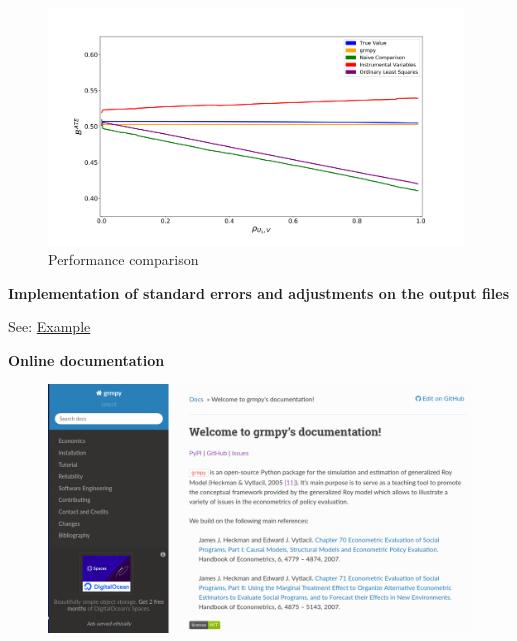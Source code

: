 \begin{frame}
\begin{figure}
  \caption{Performance comparison}
  \includegraphics[width=110mm]{figures/fig1.png}
\end{figure}


\end{frame}

\begin{frame}
\textbf{Implementation of standard errors and adjustments on the output files}
\vfill
\begin{center}
See: \href{examples/est.grmpy.info}{Example}
\end{center}
\vfill
\end{frame}

\begin{frame}
\textbf{Online documentation}
\vfill
\begin{figure}
  \includegraphics[scale=0.3]{figures/docu.png}
\end{figure}
\vfill
\end{frame}
